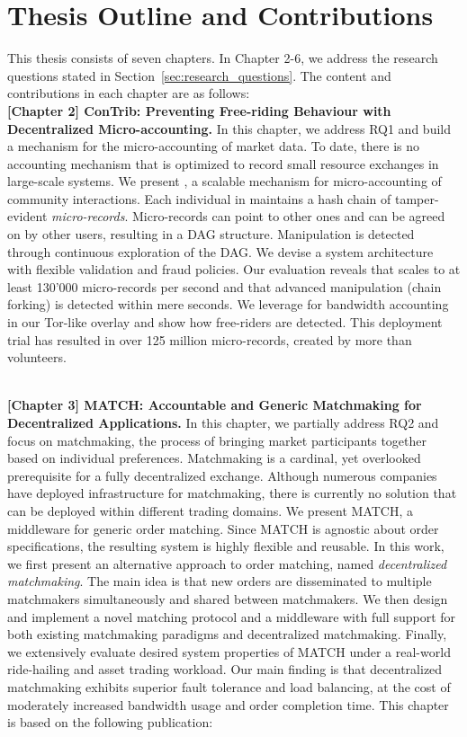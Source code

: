 \section{Thesis Outline and Contributions}
This thesis consists of seven chapters.
In Chapter 2-6, we address the research questions stated in Section~\ref{sec:research_questions}.
The content and contributions in each chapter are as follows:\\

\textbf{[Chapter 2] ConTrib: Preventing Free-riding Behaviour with Decentralized Micro-accounting.}
In this chapter, we address RQ1 and build a mechanism for the micro-accounting of market data.
To date, there is no accounting mechanism that is optimized to record small resource exchanges in large-scale systems.
We present \ModelName{}, a scalable mechanism for micro-accounting of community interactions.
Each individual in \ModelName{} maintains a hash chain of tamper-evident \emph{micro-records}.
Micro-records can point to other ones and can be agreed on by other users, resulting in a DAG structure.
Manipulation is detected through continuous exploration of the DAG.
We devise a system architecture with flexible validation and fraud policies.
Our evaluation reveals that \ModelName{} scales to at least 130'000 micro-records per second and that advanced manipulation (chain forking) is detected within mere seconds.
We leverage \ModelName{} for bandwidth accounting in our Tor-like overlay and show how free-riders are detected.
This deployment trial has resulted in over 125 million micro-records, created by more than \TrialUsers{} volunteers.

\\

\textbf{[Chapter 3] MATCH: Accountable and Generic Matchmaking for Decentralized Applications.}
In this chapter, we partially address RQ2 and focus on matchmaking, the process of bringing market participants together based on individual preferences.
Matchmaking is a cardinal, yet overlooked prerequisite for a fully decentralized exchange.
Although numerous companies have deployed infrastructure for matchmaking, there is currently no solution that can be deployed within different trading domains.
We present MATCH, a middleware for generic order matching.
Since MATCH is agnostic about order specifications, the resulting system is highly flexible and reusable.
In this work, we first present an alternative approach to order matching, named \emph{decentralized matchmaking}.
The main idea is that new orders are disseminated to multiple matchmakers simultaneously and shared between matchmakers.
We then design and implement a novel matching protocol and a middleware with full support for both existing matchmaking paradigms and decentralized matchmaking.
Finally, we extensively evaluate desired system properties of MATCH under a real-world ride-hailing and asset trading workload.
Our main finding is that decentralized matchmaking exhibits superior fault tolerance and load balancing, at the cost of moderately increased bandwidth usage and order completion time.
This chapter is based on the following publication:

